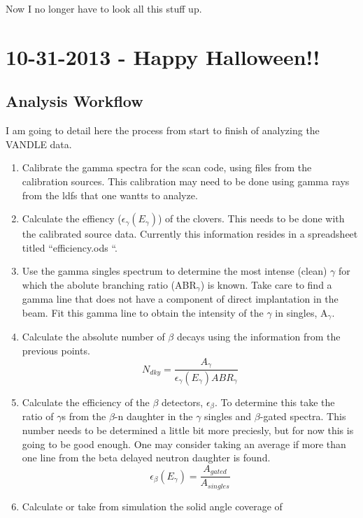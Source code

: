 Now I no longer have to look all this stuff up. 

\section{10-31-2013 - Happy Halloween!!}
\label{sec:10312013}
\subsection{Analysis Workflow}
I am going to detail here the process from start to finish of analyzing the 
VANDLE data. 
\begin{enumerate}
\item Calibrate the gamma spectra for the scan code, using files from the 
  calibration sources. This calibration may need to be done using gamma 
  rays from the ldfs that one wantts to analyze. 
\item Calculate the effiency ($\epsilon_\gamma(E_\gamma)$) of the clovers. 
  This needs to be done with the calibrated source data. Currently this 
  information resides in a spreadsheet titled ``efficiency.ods ``.
\item Use the gamma singles spectrum to determine the most intense (clean) 
  $\gamma$ for which the abolute branching ratio (ABR$_\gamma$) is known. 
  Take care to find a gamma line that does not have a component of direct 
  implantation in the beam. Fit this gamma line to obtain the intensity 
  of the $\gamma$ in singles, A$_\gamma$.
\item Calculate the absolute number of $\beta$ decays using the information 
  from the previous points.
  \begin{equation}
    N_{dky} = \frac{A_\gamma}{\epsilon_\gamma(E_\gamma)ABR_\gamma}
    \label{eqn:numDecays}
  \end{equation}
\item Calculate the efficiency of the $\beta$ detectors, $\epsilon_\beta$.
  To determine this take the ratio of $\gamma$s from the $\beta$-n 
  daughter in the $\gamma$ singles and $\beta$-gated spectra. This number 
  needs to be determined a little bit more preciesly, but for now this 
  is going to be good enough. One may consider taking an average if more 
  than one line from the beta delayed neutron daughter is found.
  \begin{equation}
    \epsilon_\beta(E_\gamma) = \frac{A_{gated}}{A_{singles}}
    \label{eqn:betaEff}
  \end{equation}
\item Calculate or take from simulation the solid angle coverage of 

\end{enumerate}
